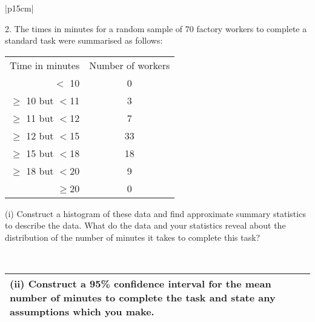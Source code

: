 \documentclass[a4paper,12pt]{article}
\begin{document}
\begin{table}[ht!]
 
\centering
 
\begin{tabular}{|p{15cm}|}
 
\hline  

2. The times in minutes for a random sample of 70 factory workers to complete a standard task were summarised as follows:
\begin{center}
\begin{tabular}{|r|c|}
      Time in minutes & Number of workers \\
$<$ 10  & 0 \\
$\geq$ 10 but $<$11 &  3\\ 
$\geq$ 11 but $<$12 &  7 \\
$\geq$ 12 but $<$15 & 33 \\
$\geq$ 15 but $<$18 & 18 \\
$\geq$ 18 but $<$20  & 9 \\
$\geq$20 &  0\\
\end{tabular}
\end{center}
(i) Construct a histogram of these data and find approximate summary statistics to describe the data.  What do the data and your statistics reveal about the distribution of the number of minutes it takes to complete this task?

\\ \hline
  
\end{tabular}

\end{table}
\begin{table}[ht!]
 
\centering
 
\begin{tabular}{|p{15cm}|}
 
\hline  

(ii) Construct a 95\% confidence interval for the mean number of minutes to complete the task and state any assumptions which you make.

\\ \hline
  
\end{tabular}

\end{table}
\end{document}
